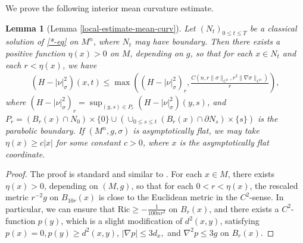 \documentclass[11pt, letterpaper]{amsart}
\newtheorem{lem}[thm]{Lemma}
\theoremstyle{definition}
\theoremstyle{remark}
\begin{document}
\begin{appendix}
We prove the following interior mean curvature estimate.
\begin{lem}[Lemma \ref{local-estimate-mean-curv}]\label{appen-local-estimate-mean-curv}
	Let $(N_t)_{0 \leq t \leq T}$ be a classical solution of \ref{*-eq} on $M^{n}$, where $N_t$ may have boundary. Then there exists a positive function $\eta (x) >0$ on $M$, depending on $g$, so that for each $x \in N_t$ and each $r< \eta(x)$, we have 
	\begin{align}
		(H - |\nu |^2_{\sigma })(x, t) \leq \max \left( (H-|\nu |^2_{\sigma })_r, \frac{C(n, r\|\sigma \|_{C^0}, r ^2 \|\nabla \sigma \|_{C^0})}{r} \right) ,
	\end{align}
	where $ (H-|\nu |^2_{\sigma })_r = \sup_{(y,s) \in P_r} (H-|\nu |^2_{\sigma })(y,s)$, and $P_r = (B_r(x) \cap N_0) \times \{0\} \cup \left( \cup _{0 \leq s \leq t}(B_r(x)\cap \partial N_s) \times \{ s\}  \right) $ is the parabolic boundary. 
If $(M^n, g ,\sigma  )$ is asymptotically flat, we may take $\eta(x) \geq c |x| $ for some constant $c>0$, where $x$ is the asymptotically flat coordinate.
\end{lem}
\begin{proof}
	The proof is standard and similar to \cite{HI01, Moore12}. For each $x \in M$, there exists $\eta (x) >0$, depending on $(M,g)$, so that for each $0<r< \eta (x)$, the rescaled metric $r ^{-2}g$ on $B_{10r}(x)$ is close to the Euclidean metric in the $C^2$-sense. In particular, we can ensure that $\mathrm{Ric} \geq - \frac{1}{100 n r ^2}$ on $B_{r}(x)$, and there exists a $C^2$-function $p(y)$, which is a slight modification of $ d^2( x, y)$, satisfying $p(x)=0, p(y) \geq d^2(x,y)$, $|\nabla p| \leq 3 d_x,$ and $\nabla ^2 p \leq 3 g $ on $B_{r}(x)$. 


\end{proof}
\end{appendix}
\end{document}
